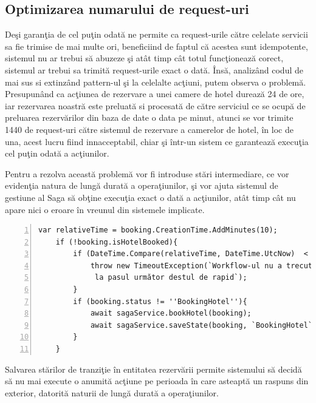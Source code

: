 \subsection{Optimizarea numarului de request-uri}
 \par Deşi garanţia de cel puţin odată ne permite ca request-urile către celelate servicii sa fie trimise de mai multe ori, beneficiind de faptul că acestea sunt idempotente, sistemul nu ar trebui să abuzeze şi atât timp cât totul funcţionează corect, sistemul ar trebui sa trimită request-urile exact o dată. Însă, analizând codul de mai sus si extinzând pattern-ul şi la celelalte acţiuni, putem observa o problemă. Presupunând ca acţiunea de rezervare a unei camere de hotel durează 24 de ore, iar rezervarea noastră este preluată si procesată de către serviciul ce se ocupă de preluarea rezervărilor din baza de date o data pe minut, atunci se vor trimite 1440 de request-uri către sistemul de rezervare a camerelor de hotel, în loc de una, acest lucru fiind innacceptabil, chiar şi într-un sistem ce garantează execuţia cel puţin odată a acţiunilor. 
 \par Pentru a rezolva această problemă vor fi introduse stări intermediare, ce vor evidenţia natura de lungă durată a operaţiunilor, şi vor ajuta sistemul de gestiune al Saga să obţine execuţia exact o dată a acţiunilor, atât timp cât nu apare nici o eroare în vreunul din sistemele implicate. 
 \begin{Verbatim}[numbers=left]
	var relativeTime = booking.CreationTime.AddMinutes(10);
	if (!booking.isHotelBooked){
		if (DateTime.Compare(relativeTime, DateTime.UtcNow)  < 0 ){
			throw new TimeoutException(`Workflow-ul nu a trecut
			 la pasul următor destul de rapid`);
		}
		if (booking.status != ''BookingHotel''){
			await sagaService.bookHotel(booking);
			await sagaService.saveState(booking, `BookingHotel`);
		}
	}
\end{Verbatim}
\par Salvarea stărilor de tranziţie în entitatea rezervării permite sistemului să decidă să nu mai execute o anumită acţiune pe perioada în care asteaptă un raspuns din exterior, datorită naturii de lungă durată a operaţiunilor.
